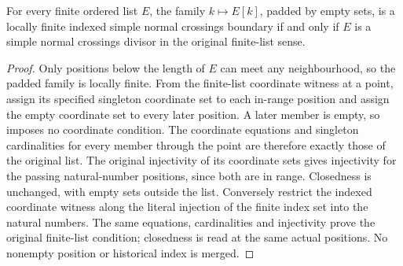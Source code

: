 \begin{lemma}
\label{hir:actual-lf-boundary-list-indexed-interface}
\leanok
For every finite ordered list $E$, the family $k\mapsto E[k]$, padded by empty
sets, is a locally finite indexed simple normal crossings boundary if and only
if $E$ is a simple normal crossings divisor in the original finite-list sense.
\end{lemma}
\begin{proof}
Only positions below the length of $E$ can meet any neighbourhood, so the padded
family is locally finite.  From the finite-list coordinate witness at a point,
assign its specified singleton coordinate set to each in-range position and
assign the empty coordinate set to every later position.  A later member is
empty, so imposes no coordinate condition.  The coordinate equations and
singleton cardinalities for every member through the point are therefore
exactly those of the original list.  The original injectivity of its coordinate
sets gives injectivity for the passing natural-number positions, since both are
in range.  Closedness is unchanged, with empty sets outside the list.  Conversely
restrict the indexed coordinate witness along the literal injection of the
finite index set into the natural numbers.  The same equations, cardinalities
and injectivity prove the original finite-list condition; closedness is read at
the same actual positions.  No nonempty position or historical index is merged.
\end{proof}

